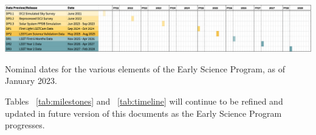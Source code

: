 \begin{table}[ht]
\centering
\includegraphics[width=\linewidth]{figures/DPR-timeline}
\caption{Nominal dates for the various elements of the Early Science Program, as of January 2023.}
\label{tab:timeline}
\end{table}

Tables ~\ref{tab:milestones} and ~\ref{tab:timeline} will continue to be refined and updated in future version of this documents as the Early Science Program progresses.
